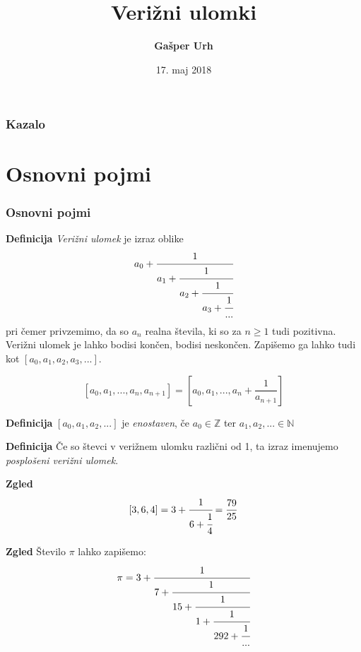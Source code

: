 \documentclass{beamer}
\title[Verižni ulomki]{Verižni ulomki}
\author[Gašper Urh]{\textbf {Gašper Urh}}
\institute[FMF UL]{\textbf {Fakulteta za matematiko in fiziko Univerze v Ljubljani}}
\date{17. maj 2018}
\newcommand{\N}{\mathbb{N}}
\newcommand{\Z}{\mathbb{Z}}
\newenvironment{df}{\begin{block}{\textbf{Definicija}}}{\end{block}}
\newenvironment{zg}{\begin{block}{\textbf{Zgled}}}{\end{block}}
\begin{document}
\begin{frame}
\maketitle
\end{frame}

\begin{frame}
\frametitle{Kazalo}
\tableofcontents
\end{frame}

\section{Osnovni pojmi}

\begin{frame}
\frametitle{Osnovni pojmi}
	\begin{df}
	\textit{Verižni ulomek} je izraz oblike
	\[ a_0 + \cfrac{1}{a_1 + \cfrac{1}{a_2 + \cfrac{1}{a_3 + \cfrac{1}{...}}}} \]
	pri čemer privzemimo, da so $a_n$ realna števila, ki so za $n \geq 1$ tudi pozitivna. Verižni ulomek je lahko bodisi končen, bodisi neskončen.
	\newline
	\newline
	Zapišemo ga lahko tudi kot $[a_0, a_1, a_2, a_3, ...]$.
	\end{df}
\end{frame}

\begin{frame}
	\[ [a_0, a_1, ..., a_n, a_{n+1}]=[a_0, a_1, ..., a_n+\frac{1}{a_{n+1}}] \] \pause
	\begin{df}
	$[a_0, a_1, a_2, ...]$ je \textit{enostaven}, če $a_0 \in \Z$ ter $a_1, a_2, ... \in \N$
	\end{df}
	\pause
	\begin{df}
	Če so števci v verižnem ulomku različni od 1, ta izraz imenujemo \textit{posplošeni verižni ulomek}.
	\end{df}
\end{frame}

\begin{frame}
	\begin{zg}
	\[ [3,6,4] = 3 + \cfrac{1}{6+\cfrac{1}{4}} = \frac{79}{25}\]
	\end{zg}
	\pause
	\begin{zg}
	Število $\pi$ lahko zapišemo: \[ \pi = 3 + \cfrac{1}{7 + \cfrac{1}{15 + \cfrac{1}{1 + \cfrac{1}{292 + \cfrac{1}{...}}}}} \]
	\end{zg}
\end{frame}
\end{document}
